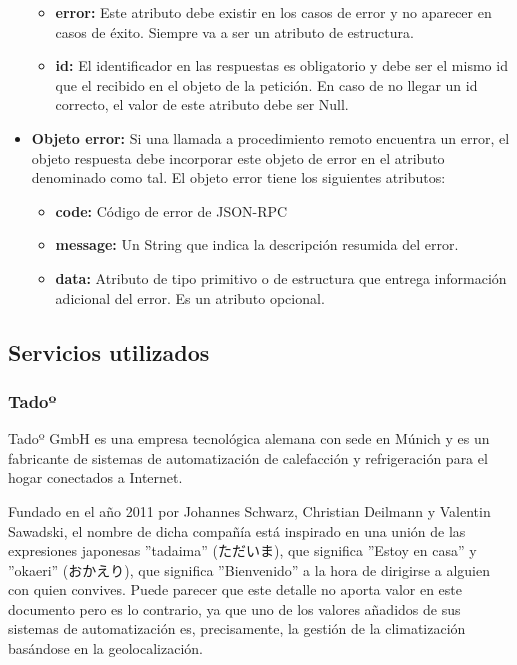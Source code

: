 \documentclass[spanish,12pt, a4paper, twoside]{paper}
\begin{document}
\begin{itemize}
\begin{itemize}
\item \textbf{error:} Este atributo debe existir en los casos de error y no aparecer en casos de éxito. Siempre va a ser un atributo de estructura.

\item \textbf{id:} El identificador en las respuestas es obligatorio y debe ser el mismo id que el recibido en el objeto de la petición. En caso de no llegar un id correcto, el valor de este atributo debe ser Null.
\end{itemize}

\item \textbf{Objeto error:} Si una llamada a procedimiento remoto encuentra un error, el objeto respuesta debe incorporar este objeto de error en el atributo denominado como tal. El objeto error tiene los siguientes atributos:

\begin{itemize}
\item \textbf{code:} Código de error de JSON-RPC

\item \textbf{message:} Un String que indica la descripción resumida del error.

\item \textbf{data:} Atributo de tipo primitivo o de estructura que entrega información adicional del error. Es un atributo opcional.
\end{itemize}

\end{itemize}

\subsection{Servicios utilizados}

\subsubsection{Tadoº}

Tadoº GmbH es una empresa tecnológica alemana con sede en Múnich y es un fabricante de sistemas de automatización de calefacción y refrigeración para el hogar conectados a Internet.
\newline

Fundado en el año 2011 por Johannes Schwarz, Christian Deilmann y Valentin Sawadski, el nombre de dicha compañía está inspirado en una unión de las expresiones japonesas ''tadaima'' (ただいま), que significa ''Estoy en casa'' y ''okaeri'' (おかえり), que significa ''Bienvenido'' a la hora de dirigirse a alguien con quien convives. 
Puede parecer que este detalle no aporta valor en este documento pero es lo contrario, ya que uno de los valores añadidos de sus sistemas de automatización es, precisamente, la gestión de la climatización basándose en la geolocalización.
\newline
\end{document}
